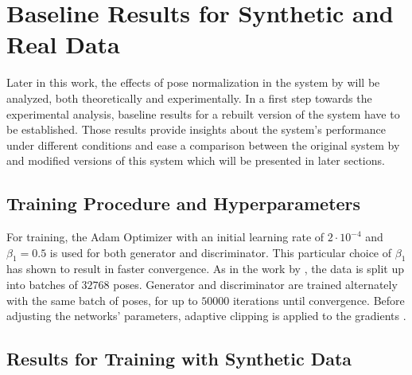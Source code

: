 \section{Baseline Results for Synthetic and Real Data}
\label{sec:evaluation}

Later in this work, the effects of pose normalization in the system by \citet{drover18} will be analyzed, both theoretically and experimentally.
In a first step towards the experimental analysis, baseline results for a rebuilt version of the system have to be established.
Those results provide insights about the system's performance under different conditions and ease a comparison between the original system by \citet{drover18} and modified versions of this system which will be presented in later sections.

\subsection{Training Procedure and Hyperparameters}
For training, the Adam Optimizer \cite{kingma17} with an initial learning rate of $2 \cdot 10^{-4}$ and $\beta_1 = 0.5$ is used for both generator and discriminator.
This particular choice of $\beta_1$ has shown to result in faster convergence.
As in the work by \citet{drover18}, the data is split up into batches of $32768$ poses.
Generator and discriminator are trained alternately with the same batch of poses, for up to $50000$ iterations until convergence.
Before adjusting the networks' parameters, adaptive clipping is applied to the gradients \cite[Section~3.2.1]{chorowski14}.


\subsection{Results for Training with Synthetic Data}
\label{sec:results-synthetic}

